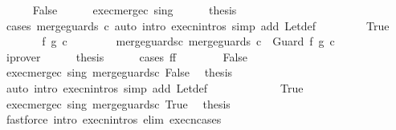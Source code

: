 \begin{isabellebody}
\ \ \ \ \isamarkupfalse%
\ False\isanewline
\ \ \ \ \isamarkupfalse%
\ exec{\isacharunderscore}merge{\isacharunderscore}c\ s{\isacharunderscore}in{\isacharunderscore}g\isanewline
\ \ \ \ \isamarkupfalse%
\ {\isacharquery}thesis\isanewline
\ \ \ \ \ \ \isamarkupfalse%
\ {\isacharparenleft}cases\ {\isachardoublequoteopen}merge{\isacharunderscore}guards\ c{\isachardoublequoteclose}{\isacharparenright}\ {\isacharparenleft}auto\ intro{\isacharcolon}\ execn{\isachardot}intros\ simp\ add{\isacharcolon}\ Let{\isacharunderscore}def{\isacharparenright}\isanewline
\ \ \isamarkupfalse%
\isanewline
\ \ \ \ \isamarkupfalse%
\ True\isanewline
\ \ \ \ \isamarkupfalse%
\ \isamarkupfalse%
\ f{\isacharprime}\ g{\isacharprime}\ c{\isacharprime}\ \ \isanewline
\ \ \ \ \ \ merge{\isacharunderscore}guards{\isacharunderscore}c{\isacharcolon}\ {\isachardoublequoteopen}merge{\isacharunderscore}guards\ c\ {\isacharequal}\ Guard\ f{\isacharprime}\ g{\isacharprime}\ c{\isacharprime}{\isachardoublequoteclose}\isanewline
\ \ \ \ \ \ \isamarkupfalse%
\ iprover\isanewline
\ \ \ \ \isamarkupfalse%
\ {\isacharquery}thesis\isanewline
\ \ \ \ \isamarkupfalse%
\ {\isacharparenleft}cases\ {\isachardoublequoteopen}f{\isacharequal}f{\isacharprime}{\isachardoublequoteclose}{\isacharparenright}\isanewline
\ \ \ \ \ \ \isamarkupfalse%
\ False\isanewline
\ \ \ \ \ \ \isamarkupfalse%
\ exec{\isacharunderscore}merge{\isacharunderscore}c\ s{\isacharunderscore}in{\isacharunderscore}g\ merge{\isacharunderscore}guards{\isacharunderscore}c\ False\ \isamarkupfalse%
\ {\isacharquery}thesis\isanewline
\ \ \ \ \ \ \ \ \isamarkupfalse%
\ {\isacharparenleft}auto\ intro{\isacharcolon}\ execn{\isachardot}intros\ simp\ add{\isacharcolon}\ Let{\isacharunderscore}def{\isacharparenright}\isanewline
\ \ \ \ \isamarkupfalse%
\isanewline
\ \ \ \ \ \ \isamarkupfalse%
\ True\isanewline
\ \ \ \ \ \ \isamarkupfalse%
\ exec{\isacharunderscore}merge{\isacharunderscore}c\ s{\isacharunderscore}in{\isacharunderscore}g\ merge{\isacharunderscore}guards{\isacharunderscore}c\ True\ \isamarkupfalse%
\ {\isacharquery}thesis\ \isanewline
\ \ \ \ \ \ \ \ \isamarkupfalse%
\ {\isacharparenleft}fastforce\ intro{\isacharcolon}\ execn{\isachardot}intros\ elim{\isacharcolon}\ execn{\isachardot}cases{\isacharparenright}\isanewline

\end{isabellebody}
